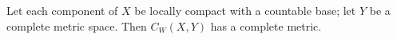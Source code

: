 Let each component of $X$ be locally compact with a countable base; let $Y$ be a complete metric space. Then $C_W(X, Y)$ has a complete metric.
